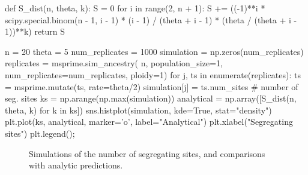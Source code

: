 \documentclass[graybox]{svmult}
\begin{document}
\begin{pythoncode}
def S_dist(n, theta, k):
    S = 0
    for i in range(2, n + 1):
        S += ((-1)**i * scipy.special.binom(n - 1, i - 1)
            * (i - 1) / (theta + i - 1)
            * (theta / (theta + i - 1))**k)
    return S

n = 20
theta = 5
num_replicates = 1000
simulation = np.zeros(num_replicates)
replicates = msprime.sim_ancestry(
    n, population_size=1, num_replicates=num_replicates, ploidy=1)
for j, ts in enumerate(replicates):
    ts = msprime.mutate(ts, rate=theta/2)
    simulation[j] = ts.num_sites  # number of seg. sites
ks = np.arange(np.max(simulation))
analytical = np.array([S_dist(n, theta, k) for k in ks])
sns.histplot(simulation, kde=True, stat="density")
plt.plot(ks, analytical, marker='o', label="Analytical")
plt.xlabel("Segregating sites")
plt.legend();
\end{pythoncode}

\begin{figure}[t]
\centering
{}
\qquad\qquad
{}
\caption{\label{fig-segsites}
Simulations of the number of segregating sites, and
comparisons with analytic predictions.
}
\end{figure}
\end{document}
